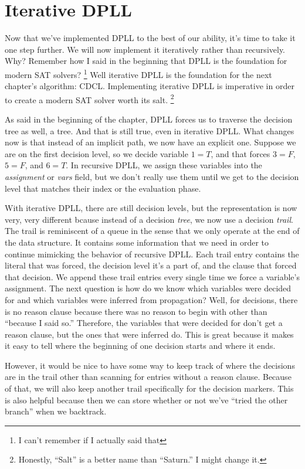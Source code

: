 \section{Iterative DPLL}

Now that we've implemented DPLL to the best of our ability, it's time to 
take it one step further. We will now implement it iteratively rather than 
recursively. Why? Remember how I said in the beginning that DPLL is the foundation 
for modern SAT solvers?
\footnote{I can't remember if I actually said that}
Well iterative DPLL is the foundation for the next chapter's algorithm: CDCL.
Implementing iterative DPLL is imperative in order to create a modern SAT solver
worth its salt.
\footnote{Honestly, ``Salt'' is a better name than ``Saturn.'' I might change it.}

As said in the beginning of the chapter, DPLL forces us to traverse the decision 
tree as well, a tree. And that is still true, even in iterative DPLL. What changes 
now is that instead of an implicit path, we now have an explicit one. Suppose we 
are on the first decision level, so we decide variable $1 = T$, and that forces 
$3 = F$, $5 = F$, and $6 = T$. In recursive DPLL, we assign these variables into 
the \textit{assignment} or \textit{vars} field, but we don't really use them until 
we get to the decision level that matches their index or the evaluation phase. 

With iterative DPLL, there are still decision levels, but the representation is 
now very, very different bcause instead of a decision \textit{tree}, we now use a 
decision \textit{trail}. The trail is reminiscent of a queue in the sense that 
we only operate at the end of the data structure. It contains some information 
that we need in order to continue mimicking the behavior of recursive DPLL. Each 
trail entry contains the literal that was forced, the decision level it's a part of,
and the clause that forced that decision. We append these trail entries every single 
time we force a variable's assignment. The next question is how do we know which 
variables were decided for and which variables were inferred from propagation?
Well, for decisions, there is no reason clause because there was no reason to 
begin with other than ``because I said so.'' Therefore, the variables that were 
decided for don't get a reason clause, but the ones that were inferred do. This 
is great because it makes it easy to tell where the beginning of one decision 
starts and where it ends.

However, it would be nice to have some way to keep track of where the decisions
are in the trail other than scanning for entries without a reason clause. Because 
of that, we will also keep another trail specifically for the decision markers.
This is also helpful because then we can store whether or not we've ``tried the 
other branch'' when we backtrack. 

